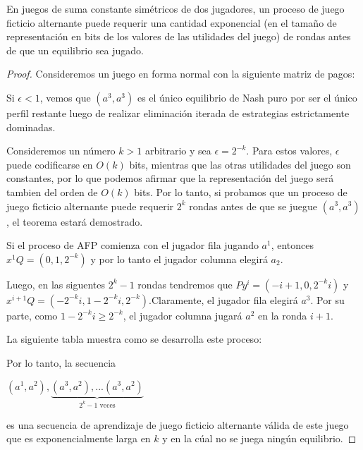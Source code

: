\begin{theorem}
    En juegos de suma constante simétricos de dos jugadores, un proceso de juego ficticio alternante puede requerir una cantidad exponencial (en el tamaño de representación en bits de los valores de las utilidades del juego) de rondas antes de que un equilibrio sea jugado.
\end{theorem}

\begin{proof}
    Consideremos un juego en forma normal con la siguiente matriz de pagos:

    

    Si $\epsilon < 1$, vemos que $(a^3, a^3)$ es el único equilibrio de Nash puro por ser el único perfil restante luego de realizar eliminación iterada de estrategias estrictamente dominadas.

    Consideremos un número $k > 1$ arbitrario y sea $\epsilon = 2^{-k}$. Para estos valores, $\epsilon$ puede codificarse en $O(k)$ bits, mientras que las otras utilidades del juego son constantes, por lo que podemos afirmar que la representación del juego será tambien del orden de  $O(k)$ bits. Por lo tanto, si probamos que un proceso de juego ficticio alternante puede requerir $2^k$ rondas antes de que se juegue $(a^3, a^3)$, el teorema estará demostrado.

    Si el proceso de AFP comienza con el jugador fila jugando $a^1$, entonces $x^1Q = (0, 1, 2^{-k})$ y por lo tanto el jugador columna elegirá $a_2$.

    Luego, en las siguentes $2^k - 1$ rondas tendremos que $Py^i = (-i + 1, 0, 2^{-k}i)$ y $x^{i+1}Q = (-2^{-k}i, 1 - 2^{-k}i, 2^{-k})$.Claramente, el jugador fila elegirá $a^3$. Por su parte, como $1 - 2^{-k}i \ge 2^{-k}$, el jugador columna jugará $a^2$ en la ronda $i + 1$.

    La siguiente tabla muestra como se desarrolla este proceso:

    

    Por lo tanto, la secuencia

    \begin{center}
    \begin{math}
        (a^1, a^2), \underbrace{(a^3, a^2), ... (a^3, a^2)}_{\text{$2^k - 1$ veces}}
    \end{math}
    \end{center}

    es una secuencia de aprendizaje de juego ficticio alternante válida de este juego que es exponencialmente larga en $k$ y en la cúal no se juega ningún equilibrio.
\end{proof}

